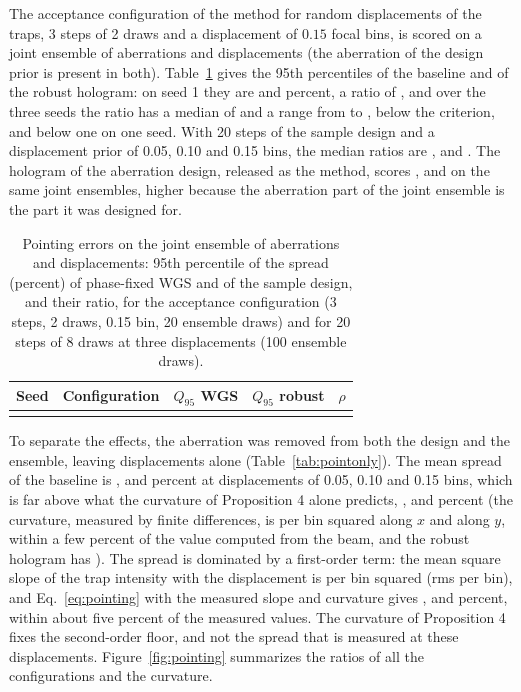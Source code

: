 The acceptance configuration of the method for random displacements of the traps, 3 steps of 2 draws and a displacement of $0.15$ focal bins, is scored on a joint ensemble of aberrations and displacements (the aberration of the design prior is present in both). Table~\ref{tab:pointing} gives the 95th percentiles of the baseline and of the robust hologram: on seed 1 they are \ptAccNomOne{} and \ptAccBfourOne{} percent, a ratio of \ptAccOne, and over the three seeds the ratio has a median of \ptAccMed{}
and a range from \ptAccMin{} to \ptAccMax, below the criterion, and below one on one seed. With 20 steps of the sample design and a displacement prior of 0.05, 0.10 and 0.15 bins, the median ratios are \ptASample{}, \ptBSample{} and \ptCSample. The hologram of the aberration design, released as the method, scores \ptASigma, \ptBSigma{} and \ptCSigma{} on the same joint ensembles, higher because the aberration part of the joint ensemble is the part it was designed for.

\begin{table}[t]
\centering\small
\caption{Pointing errors on the joint ensemble of aberrations and displacements: 95th percentile of the spread (percent) of phase-fixed WGS and of the sample design, and their ratio, for the acceptance configuration (3 steps, 2 draws, 0.15 bin, 20 ensemble draws) and for 20 steps of 8 draws at three displacements (100 ensemble draws).}
\label{tab:pointing}
\begin{tabular}{@{}r l r r r@{}}
\toprule
Seed & Configuration & $Q_{95}$ WGS & $Q_{95}$ robust & $\rho$\\
\midrule
\\
\bottomrule
\end{tabular}
\end{table}

To separate the effects, the aberration was removed from both the design and the ensemble, leaving displacements alone (Table~\ref{tab:pointonly}). The mean spread of the baseline is \poANom{}, \poBNom{} and \poCNom{} percent at displacements of 0.05, 0.10 and 0.15 bins, which is far above what the curvature of Proposition 4 alone predicts, \poAPred{}, \poBPred{} and \poCPred{} percent (the curvature, measured by finite differences, is \poKx{} per bin squared along $x$ and \poKy{} along $y$, within
a few percent of the value \curvAp{} computed from the beam, and the robust hologram has \curvBfour). The spread is dominated by a first-order term: the mean square slope of the trap intensity with the displacement is \poSlopeSq{} per bin squared (rms \poSlopeRms{} per bin), and Eq.~\eqref{eq:pointing} with the measured slope and curvature gives \poAPredSlope{}, \poBPredSlope{} and \poCPredSlope{} percent, within about five percent of the measured values. The curvature of Proposition 4 fixes the second-order floor, and not the spread
that is measured at these displacements. Figure~\ref{fig:pointing} summarizes the ratios of all the configurations and the curvature.

